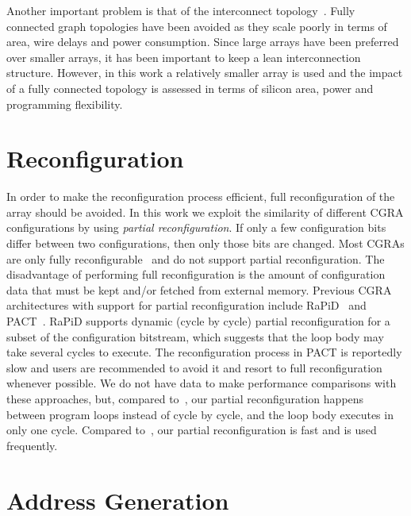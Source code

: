 Another important problem is that of the interconnect topology~\cite{Park09}.
Fully connected graph topologies have been avoided as they scale poorly in
terms of area, wire delays and power consumption. Since large arrays
have been preferred over smaller arrays, it has been important to keep
a lean interconnection structure. However, in this work a relatively
smaller array is used and the impact of a fully connected topology is
assessed in terms of silicon area, power and programming flexibility.



\section{Reconfiguration}
\label{section:reconfiguration}

In order to make the reconfiguration process efficient, full
reconfiguration of the array should be avoided. In this work we
exploit the similarity of different CGRA configurations by using {\it
partial reconfiguration}. If only a few configuration bits differ
between two configurations, then only those bits are changed. Most
CGRAs are only fully reconfigurable~\cite{Mei05,Lee00,Hartenstein99}
and do not support partial reconfiguration. The disadvantage of performing
full reconfiguration is the amount of configuration data that must be kept
and/or fetched from external memory. Previous CGRA architectures with support
for partial reconfiguration include RaPiD~\cite{Ebeling96} and PACT~\cite{Weinhardt03}. RaPiD supports dynamic (cycle by cycle) partial reconfiguration for a subset of the configuration bitstream, which suggests
that the loop body may take several cycles to execute. The reconfiguration
process in PACT is reportedly slow and users are recommended to avoid it and
resort to full reconfiguration whenever possible. We do not have data to make
performance comparisons with these approaches, but, compared to~\cite{Ebeling96}, our partial reconfiguration happens between program loops instead of cycle
by cycle, and the loop body executes in only one cycle. Compared to~\cite{Weinhardt03}, our partial reconfiguration is fast and is used frequently.

\section{Address Generation}
\label{section:addressGenerator}

